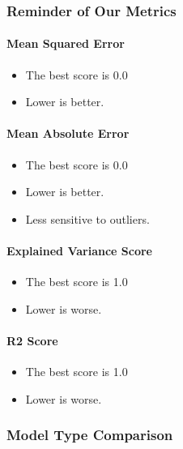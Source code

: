 \documentclass[11pt]{article}
\providecommand{\tightlist}{%
      \setlength{\itemsep}{0pt}\setlength{\parskip}{0pt}}
\begin{document}
    \subsubsection{Reminder of Our Metrics}\label{reminder-of-our-metrics}

\paragraph{Mean Squared Error}\label{mean-squared-error}

\begin{itemize}
\tightlist
\item
  The best score is 0.0
\item
  Lower is better.
\end{itemize}

\paragraph{Mean Absolute Error}\label{mean-absolute-error}

\begin{itemize}
\tightlist
\item
  The best score is 0.0
\item
  Lower is better.
\item
  Less sensitive to outliers.
\end{itemize}

\paragraph{Explained Variance Score}\label{explained-variance-score}

\begin{itemize}
\tightlist
\item
  The best score is 1.0
\item
  Lower is worse.
\end{itemize}

\paragraph{R2 Score}\label{r2-score}

\begin{itemize}
\tightlist
\item
  The best score is 1.0
\item
  Lower is worse.
\end{itemize}

    \subsubsection{Model Type Comparison}\label{model-type-comparison}
\end{document}
